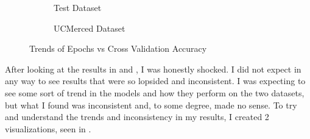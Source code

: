 \documentclass[12pt]{article}
\begin{document}
	\begin{figure}[t!]
	\centering
		\begin{subfigure}[b]{0.4\linewidth}
			\centering
			\caption{Test Dataset}	
		\end{subfigure}
		\begin{subfigure}[b]{0.4\linewidth}
			\centering
			\caption{UCMerced Dataset}
			\label{fig:ucm_trend}
		\end{subfigure}
		\caption{Trends of Epochs vs Cross Validation Accuracy}
		\label{fig:result_graphs}
	\end{figure}
	
	After looking at the results in  and , I was honestly shocked. I did not expect in any way to see results that were so lopsided and inconsistent. I was expecting to see some sort of trend in the models and how they perform on the two datasets, but what I found was inconsistent and, to some degree, made no sense. To try and understand the trends and inconsistency in my results, I created 2 visualizations, seen in . 
	
\end{document}
